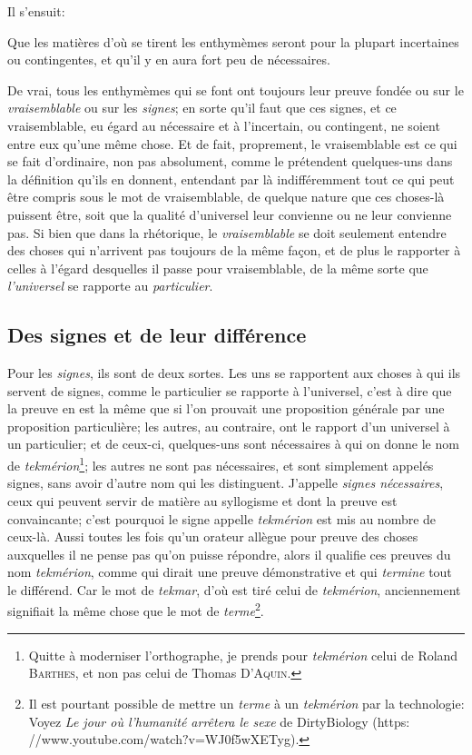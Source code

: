 Il s'ensuit:

\begin{emphpar}
	Que les matières d'où se tirent les enthymèmes seront pour la plupart incertaines ou contingentes, et qu'il y en aura fort peu de nécessaires.
\end{emphpar}

De vrai, tous les enthymèmes qui se font ont toujours leur preuve fondée ou sur le \emph{vraisemblable} ou sur les \emph{signes}; en sorte qu'il faut que
ces signes, et ce vraisemblable, eu égard au nécessaire et à l'incertain, ou contingent, ne soient entre eux qu'une même chose. Et de fait, proprement,
le vraisemblable est ce qui se fait d'ordinaire, non %
pas absolument, comme le prétendent quelques-uns dans la définition qu'ils en donnent, entendant par là indifféremment tout ce qui peut être compris sous
le mot de vraisemblable, de quelque nature que ces choses-là puissent être, soit que la qualité d'universel leur convienne ou ne leur convienne pas. Si
bien que dans la rhétorique, le \emph{vraisemblable} se doit seulement entendre des choses qui n'arrivent pas toujours de la même façon, et de plus le rapporter
à celles à l'égard desquelles il passe pour vraisemblable, de la même sorte que \emph{l'universel} se rapporte au \emph{particulier}.

\subsection{Des signes et de leur différence}

Pour les \emph{signes}, ils sont de deux sortes. Les uns se rapportent aux choses à qui ils servent de signes, comme le particulier se rapporte à l'universel,
c'est à dire que la preuve en est la même que si l'on prouvait une proposition générale par une proposition particulière; les autres, au contraire, ont
le rapport d'un universel à un particulier; et de ceux-ci, quelques-uns sont nécessaires à qui on donne le nom de \emph{tekmérion}\footnote{Quitte à moderniser
l'orthographe, je prends pour \emph{tekmérion} celui de Roland \textsc{Barthes}, et non pas celui de Thomas \textsc{D'Aquin}.}; les autres ne sont
pas nécessaires, et sont simplement appelés signes, sans avoir d'autre nom qui les distinguent. J'appelle \emph{signes nécessaires}, ceux qui peuvent
servir de matière au syllogisme et dont la preuve est convaincante; c'est pourquoi le signe appelle \emph{tekmérion} est mis au nombre de ceux-là. Aussi
toutes les fois qu'un orateur allègue pour preuve des choses auxquelles il ne pense pas qu'on puisse répondre, alors il qualifie ces preuves du nom
\emph{tekmérion}, comme qui dirait une preuve démonstrative et qui \emph{termine} tout le différend. Car le mot de \emph{tekmar}, d'où est tiré celui de
\emph{tekmérion}, anciennement signifiait la même chose que le mot de \emph{terme}\footnote{Il est pourtant possible de mettre un \emph{terme} à un
\emph{tekmérion} par la technologie: Voyez \emph{Le jour où l'humanité arrêtera le sexe} de DirtyBiology
(https${:}$//www.youtube.com/watch${?}$v=WJ0f5wXETyg).}.

